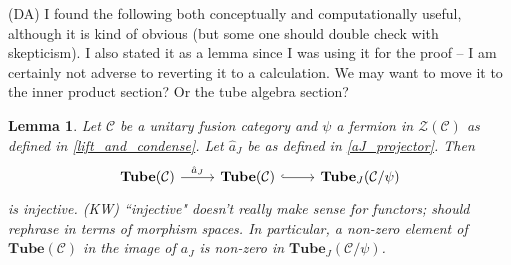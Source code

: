 \documentclass[12pt,a4paper]{article}
\newtheorem{lemma}[theorem]{Lemma}
\newcounter{arrow}
\newcommand{\mcz}{\mathcal{Z}}
\newcommand{\mcc}{\mathcal{C}}
\newcommand{\tube}{\textbf{Tube}}
\newcommand{\kw}[1]{{\color{kwcolor}\footnotesize{(KW) #1}}}
\newcommand{\dave}[1]{{\color{ao(english)}\footnotesize{(DA) #1}}}
\begin{document}
\dave{I found the following both conceptually and computationally useful, although it is kind of obvious (but some one should double check with skepticism).
I also stated it as a lemma since I was using it for the proof -- I am certainly not adverse to reverting it to a calculation.
We may want to move it to the inner product section?
Or the tube algebra section?}
\begin{lemma}
\label{image_aJ}
Let $\mcc$ be a unitary fusion category and $\psi$ a fermion in $\mcz(\mcc)$ as defined in \ref{lift_and_condense}.
Let $\hat{a}_J$ be as defined in \eqref{aJ_projector}.
Then 
\[\begin{tikzcd}        
    \tube(\mcc)\arrow{r}{\hat{a}_J} &\tube(\mcc) \arrow[hook]{r} &  \tube_J(\mcc/\psi)
\end{tikzcd}\]
is injective.
\kw{``injective" doesn't really make sense for functors; should rephrase in terms of morphism spaces.}
In particular, a non-zero element of $\tube(\mcc)$ in the image of $a_J$ is non-zero in $\tube_J(\mcc/\psi)$.
\end{lemma}
\end{document}
